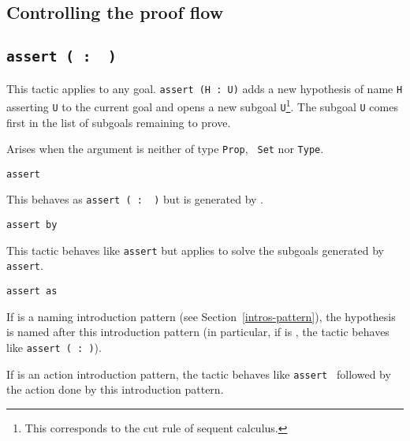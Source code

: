 \begin{coq_example*}
\section{Controlling the proof flow}

\subsection{\tt assert ( {\ident} :\ {\form} )}

This tactic applies to any goal. {\tt assert (H : U)} adds a new
hypothesis of name \texttt{H} asserting \texttt{U} to the current goal
and opens a new subgoal \texttt{U}\footnote{This corresponds to the
  cut rule of sequent calculus.}. The subgoal {\texttt U} comes first
in the list of subgoals remaining to prove.

\begin{ErrMsgs}
\item {}

  Arises when the argument {\form} is neither of type {\tt Prop}, {\tt
    Set} nor {\tt Type}.

\end{ErrMsgs}

\begin{Variants}

\item{\tt assert {\form}}

  This behaves as {\tt assert ( {\ident} :\ {\form} )} but
  {\ident} is generated by {\Coq}.

\item \texttt{assert {\form} by {\tac}}

  This tactic behaves like \texttt{assert} but applies {\tac}
  to solve the subgoals generated by \texttt{assert}.

  \ErrMsg {}

\item \texttt{assert {\form} as {\intropattern}}

  If {\intropattern} is a naming introduction pattern (see
  Section~\ref{intros-pattern}), the hypothesis is named after this
  introduction pattern (in particular, if {\intropattern} is {\ident},
  the tactic behaves like \texttt{assert ({\ident} :\ {\form})}).

  If {\intropattern} is an action introduction pattern, the tactic
  behaves like \texttt{assert {\form}} followed by the action done by
  this introduction pattern.


\end{Variants}
\end{coq_example*}

